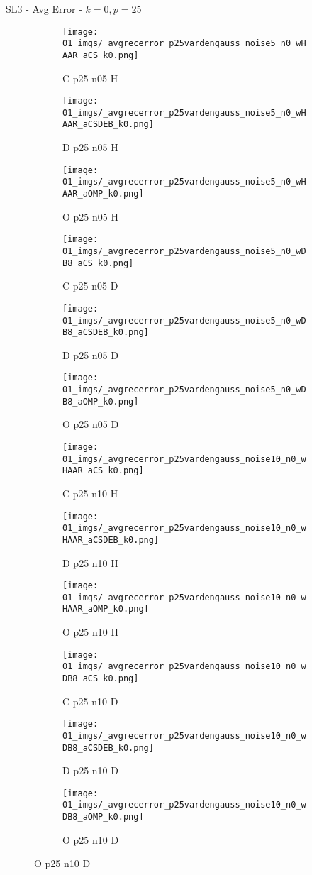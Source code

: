 \begin{frame}{SL3 - Avg Error - $k=0,p=25$}{}
\begin{figure}
\begin{subfigure}{0.13\textwidth}
\texttt{[image: 01\_imgs/\_avgrecerror\_p25vardengauss\_noise5\_n0\_wHAAR\_aCS\_k0.png]}
\caption*{\tiny C p25 n05 H}
\end{subfigure}
\begin{subfigure}{0.13\textwidth}
\texttt{[image: 01\_imgs/\_avgrecerror\_p25vardengauss\_noise5\_n0\_wHAAR\_aCSDEB\_k0.png]}
\caption*{\tiny D p25 n05 H}
\end{subfigure}
\begin{subfigure}{0.13\textwidth}
\texttt{[image: 01\_imgs/\_avgrecerror\_p25vardengauss\_noise5\_n0\_wHAAR\_aOMP\_k0.png]}
\caption*{\tiny O p25 n05 H}
\end{subfigure}
\begin{subfigure}{0.13\textwidth}
\texttt{[image: 01\_imgs/\_avgrecerror\_p25vardengauss\_noise5\_n0\_wDB8\_aCS\_k0.png]}
\caption*{\tiny C p25 n05 D}
\end{subfigure}
\begin{subfigure}{0.13\textwidth}
\texttt{[image: 01\_imgs/\_avgrecerror\_p25vardengauss\_noise5\_n0\_wDB8\_aCSDEB\_k0.png]}
\caption*{\tiny D p25 n05 D}
\end{subfigure}
\begin{subfigure}{0.13\textwidth}
\texttt{[image: 01\_imgs/\_avgrecerror\_p25vardengauss\_noise5\_n0\_wDB8\_aOMP\_k0.png]}
\caption*{\tiny O p25 n05 D}
\end{subfigure}

\vspace{5pt}

\begin{subfigure}{0.13\textwidth}
\texttt{[image: 01\_imgs/\_avgrecerror\_p25vardengauss\_noise10\_n0\_wHAAR\_aCS\_k0.png]}
\caption*{\tiny C p25 n10 H}
\end{subfigure}
\begin{subfigure}{0.13\textwidth}
\texttt{[image: 01\_imgs/\_avgrecerror\_p25vardengauss\_noise10\_n0\_wHAAR\_aCSDEB\_k0.png]}
\caption*{\tiny D p25 n10 H}
\end{subfigure}
\begin{subfigure}{0.13\textwidth}
\texttt{[image: 01\_imgs/\_avgrecerror\_p25vardengauss\_noise10\_n0\_wHAAR\_aOMP\_k0.png]}
\caption*{\tiny O p25 n10 H}
\end{subfigure}
\begin{subfigure}{0.13\textwidth}
\texttt{[image: 01\_imgs/\_avgrecerror\_p25vardengauss\_noise10\_n0\_wDB8\_aCS\_k0.png]}
\caption*{\tiny C p25 n10 D}
\end{subfigure}
\begin{subfigure}{0.13\textwidth}
\texttt{[image: 01\_imgs/\_avgrecerror\_p25vardengauss\_noise10\_n0\_wDB8\_aCSDEB\_k0.png]}
\caption*{\tiny D p25 n10 D}
\end{subfigure}
\begin{subfigure}{0.13\textwidth}
\texttt{[image: 01\_imgs/\_avgrecerror\_p25vardengauss\_noise10\_n0\_wDB8\_aOMP\_k0.png]}
\caption*{\tiny O p25 n10 D}
\end{subfigure}


\end{figure}
\end{frame}
